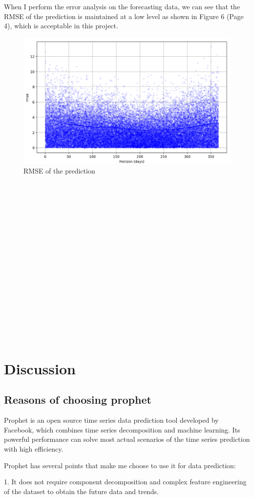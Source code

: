 \documentclass{article}
\begin{document}
When I perform the error analysis on the forecasting data, we can see that the RMSE of the prediction is maintained at a low level as shown in Figure 6 (Page 4), which is acceptable in this project.

\begin{figure}[htbp]
\centering
\includegraphics[width=12cm]{rmse.png} %
\caption{RMSE of the prediction} %
\end{figure}

\

\

\

\

\

\
\
\

\

\

\

\


\section{Discussion}

\subsection{Reasons of choosing prophet}

Prophet is an open source time series data prediction tool developed by Facebook, which combines time series decomposition and machine learning. Its powerful performance can solve most actual scenarios of the time series prediction with high efficiency.

Prophet has several points that make me choose to use it for data prediction:

1. It does not require component decomposition and complex feature engineering of the dataset to obtain the future data and trends.
\end{document}
